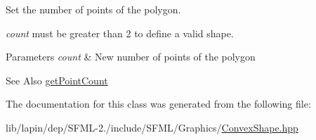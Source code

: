 Set the number of points of the polygon. 

{\itshape count} must be greater than 2 to define a valid shape.


\begin{DoxyParams}{Parameters}
{\em count} & New number of points of the polygon\\
\hline
\end{DoxyParams}
\begin{DoxySeeAlso}{See Also}
\hyperlink{classsf_1_1_convex_shape_a8c420c1fc0f51706a15509ab53278f4a}{get\-Point\-Count} 
\end{DoxySeeAlso}


The documentation for this class was generated from the following file\-:\begin{DoxyCompactItemize}
\item 
lib/lapin/dep/\-S\-F\-M\-L-\/2./include/\-S\-F\-M\-L/\-Graphics/\hyperlink{lapin_2dep_2_s_f_m_l-2_83_2include_2_s_f_m_l_2_graphics_2_convex_shape_8hpp}{Convex\-Shape.\-hpp}\end{DoxyCompactItemize}
